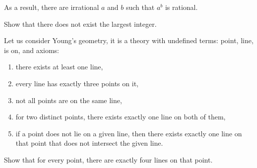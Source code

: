 \begin{chapterendexercises}
\begin{solution}
          As a result, there are irrational $a$ and $b$ such that $a^b$ is
          rational.
        \end{solution}
    \exercise[recommended] Show that there does not exist the largest integer.

    \exercise Let us consider Young's geometry, it is a theory with undefined
        terms: point, line, is on, and axioms:
        \begin{enumerate}
            \item there exists at least one line,
            \item every line has exactly three points on it,
            \item not all points are on the same line,
            \item for two distinct points, there exists exactly one line on both of
              them,
            \item if a point does not lie on a given line, then there exists exactly
              one line on that point that does not intersect the given line.
        \end{enumerate}

        Show that for every point, there are exactly four lines on that point.

\end{chapterendexercises}
